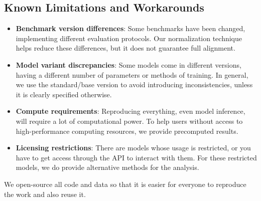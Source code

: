 \documentclass[preprint,12pt]{elsarticle}
\begin{document}
\subsection{Known Limitations and Workarounds}
\begin{itemize}
   \item \textbf{Benchmark version differences}: Some benchmarks have been changed, implementing different evaluation protocols. Our normalization technique helps reduce these differences, but it does not guarantee full alignment.

   \item \textbf{Model variant discrepancies}: Some models come in different versions, having a different number of parameters or methods of training. In general, we use the standard/base version to avoid introducing inconsistencies, unless it is clearly specified otherwise.

   \item \textbf{Compute requirements}: Reproducing everything, even model inference, will require a lot of computational power. To help users without access to high-performance computing resources, we provide precomputed results.
   
   \item \textbf{Licensing restrictions}: There are models whose usage is restricted, or you have to get access through the API to interact with them. For these restricted models, we do provide alternative methods for the analysis.
\end{itemize}

We open-source all code and data so that it is easier for everyone to reproduce the work and also reuse ‍‌it.




\end{document}
